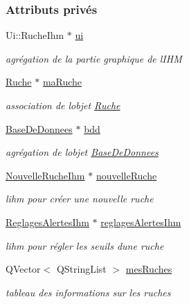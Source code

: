 \subsubsection*{Attributs privés}
\begin{DoxyCompactItemize}
\item 
Ui\+::\+Ruche\+Ihm $\ast$ \hyperlink{class_ruche_ihm_a64786058bd7f88ca2f1e9743bb27c25b}{ui}
\begin{DoxyCompactList}\small\item\em agrégation de la partie graphique de l\textquotesingle{}I\+HM \end{DoxyCompactList}\item 
\hyperlink{class_ruche}{Ruche} $\ast$ \hyperlink{class_ruche_ihm_a43a6b1fa31f4fba58d919daae3707b38}{ma\+Ruche}
\begin{DoxyCompactList}\small\item\em association de l\textquotesingle{}objet \hyperlink{class_ruche}{Ruche} \end{DoxyCompactList}\item 
\hyperlink{class_base_de_donnees}{Base\+De\+Donnees} $\ast$ \hyperlink{class_ruche_ihm_a0851936fe212e8d40538264f09749153}{bdd}
\begin{DoxyCompactList}\small\item\em agrégation de l\textquotesingle{}objet \hyperlink{class_base_de_donnees}{Base\+De\+Donnees} \end{DoxyCompactList}\item 
\hyperlink{class_nouvelle_ruche_ihm}{Nouvelle\+Ruche\+Ihm} $\ast$ \hyperlink{class_ruche_ihm_a3a27b7af842244c6db3623f5f256bed5}{nouvelle\+Ruche}
\begin{DoxyCompactList}\small\item\em l\textquotesingle{}ihm pour créer une nouvelle ruche \end{DoxyCompactList}\item 
\hyperlink{class_reglages_alertes_ihm}{Reglages\+Alertes\+Ihm} $\ast$ \hyperlink{class_ruche_ihm_a04068fbec978c2443f3baf08d4945929}{reglages\+Alertes\+Ihm}
\begin{DoxyCompactList}\small\item\em l\textquotesingle{}ihm pour régler les seuils d\textquotesingle{}une ruche \end{DoxyCompactList}\item 
Q\+Vector$<$ Q\+String\+List $>$ \hyperlink{class_ruche_ihm_ab7741fa67b19cbb2da7eb12c58cf83c1}{mes\+Ruches}
\begin{DoxyCompactList}\small\item\em tableau des informations sur les ruches \end{DoxyCompactList}\item 

\end{DoxyCompactItemize}

